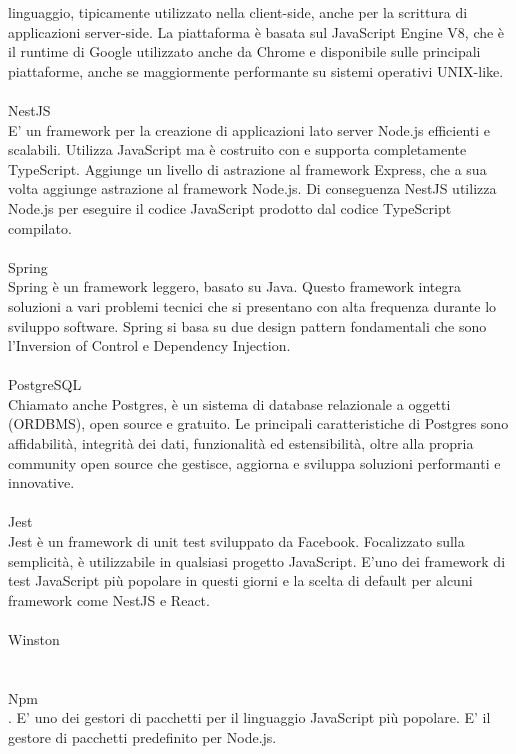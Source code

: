 linguaggio, tipicamente utilizzato nella client-side, anche per la scrittura di applicazioni server-side.
La piattaforma è basata sul JavaScript Engine V8, che è il runtime di Google utilizzato anche da Chrome e 
disponibile sulle principali piattaforme, anche se maggiormente performante su sistemi operativi UNIX-like.
\\\\
NestJS
\\
E' un framework per la creazione di applicazioni lato server Node.js efficienti e scalabili. 
Utilizza JavaScript ma è costruito con e supporta completamente TypeScript. Aggiunge un livello di astrazione
al framework Express, che a sua volta aggiunge astrazione al framework Node.js. Di conseguenza NestJS 
utilizza Node.js per eseguire il codice JavaScript prodotto dal codice TypeScript compilato.
\\\\
Spring
\\
Spring è un framework leggero, basato su Java. Questo framework integra soluzioni a vari problemi tecnici
che si presentano con alta frequenza durante lo sviluppo software. Spring si basa su due design pattern
fondamentali che sono l'Inversion of Control e Dependency Injection.
\\\\
PostgreSQL
\\
Chiamato anche Postgres, è un sistema di database relazionale a oggetti (ORDBMS), open source e 
gratuito.
Le principali caratteristiche di Postgres sono affidabilità, integrità dei dati, funzionalità ed estensibilità, 
oltre alla propria community open source che gestisce, aggiorna e sviluppa soluzioni performanti e innovative.
\\\\
Jest
\\
Jest è un framework di unit test sviluppato da Facebook. Focalizzato sulla semplicità, è utilizzabile in qualsiasi
progetto JavaScript. E'uno dei framework di test JavaScript più popolare in questi giorni e la scelta di default 
per alcuni framework come NestJS e React.
\\\\
Winston
\\
\\\\
Npm
\\.
E' uno dei gestori di pacchetti per il linguaggio JavaScript più popolare. E' il gestore di pacchetti predefinito 
per Node.js.

